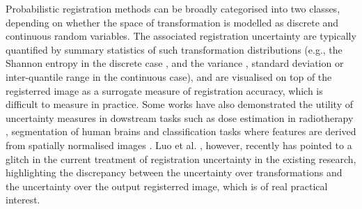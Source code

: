 Probabilistic registration methods can be broadly categorised into two classes, depending on whether the space of transformation is modelled as discrete \cite{cobzas2011random,popuri2013variational,heinrich2016deformable} and continuous \cite{van2008encoding,simpson2012probabilistic,risholm2013bayesian,zhang2013bayesian,wassermann2014probabilistic,simpson2015probabilistic,le2016quantifying} random variables. The associated registration uncertainty are typically quantified by summary statistics of such transformation distributions (e.g., the Shannon entropy in the discrete case \cite{lotfi2013improving}, and the variance \cite{simpson2012probabilistic,le2016quantifying}, standard deviation\cite{simpson2015probabilistic} or inter-quantile range \cite{risholm2013bayesian,risholm2010summarizing} in the continuous case), and are visualised on top of the registerred image as a surrogate measure of registration accuracy, which is difficult to measure in practice. Some works have also demonstrated the utility of uncertainty measures in dowstream tasks such as dose estimation in radiotherapy \cite{risholm2011estimation}, segmentation of human brains \cite{simpson2011probabilistic} and classification tasks where features are derived from spatially normalised images \cite{simpson2012ensemble}. Luo et al. \cite{wells2018miccai}, however, recently has pointed to a glitch in the current treatment of registration uncertainty in the existing research, highlighting the discrepancy between the  uncertainty over transformations and the uncertainty over the output registerred image, which is of real practical interest. 




%
%



